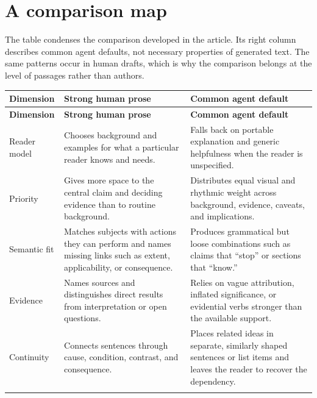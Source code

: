 \section{A comparison map}
\label{app:patterns}

The table condenses the comparison developed in the article. Its right column
describes common agent defaults, not necessary properties of generated text.
The same patterns occur in human drafts, which is why the comparison belongs
at the level of passages rather than authors.

\begingroup
\small
\setlength{\tabcolsep}{4pt}
\begin{longtable}{@{}>{\raggedright\arraybackslash}p{}
  >{\raggedright\arraybackslash}p{}
  >{\raggedright\arraybackslash}p{}@{}}
\toprule
\textbf{Dimension} & \textbf{Strong human prose} &
\textbf{Common agent default} \\
\midrule
\endfirsthead
\toprule
\textbf{Dimension} & \textbf{Strong human prose} &
\textbf{Common agent default} \\
\midrule
\endhead

Reader model &
Chooses background and examples for what a particular reader knows and needs. &
Falls back on portable explanation and generic helpfulness when the reader is
unspecified. \\
\addlinespace

Priority &
Gives more space to the central claim and deciding evidence than to routine
background. &
Distributes equal visual and rhythmic weight across background, evidence,
caveats, and implications. \\
\addlinespace

Semantic fit &
Matches subjects with actions they can perform and names missing links such as
extent, applicability, or consequence. &
Produces grammatical but loose combinations such as claims that ``stop'' or
sections that ``know.'' \\
\addlinespace

Evidence &
Names sources and distinguishes direct results from interpretation or open
questions. &
Relies on vague attribution, inflated significance, or evidential verbs
stronger than the available support. \\
\addlinespace

Continuity &
Connects sentences through cause, condition, contrast, and consequence. &
Places related ideas in separate, similarly shaped sentences or list items and
leaves the reader to recover the dependency. \\
\addlinespace


\end{longtable}
